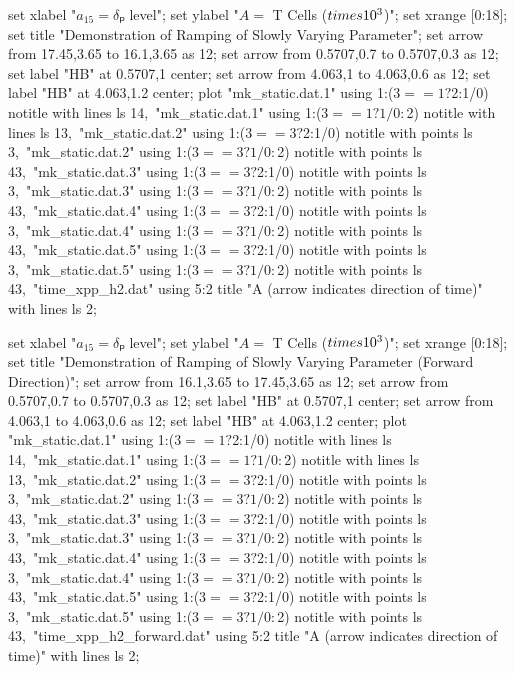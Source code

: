   set xlabel "$a_{15} = δₚ$ level";
  set ylabel "$A = $ T Cells ($\\times 10^3$)";
  set xrange [0:18];
  set title "Demonstration of Ramping of Slowly Varying Parameter";
  set arrow from 17.45,3.65 to 16.1,3.65 as 12;
  set arrow from 0.5707,0.7 to 0.5707,0.3 as 12;
  set label "HB" at 0.5707,1 center;
  set arrow from 4.063,1 to 4.063,0.6 as 12;
  set label "HB" at 4.063,1.2 center;
  plot "mk_static.dat.1" using 1:($3==1?$2:1/0) notitle with lines ls 14,\
       "mk_static.dat.1" using 1:($3==1?1/0:$2) notitle with lines ls 13,\
       "mk_static.dat.2" using 1:($3==3?$2:1/0) notitle with points ls 3,\
       "mk_static.dat.2" using 1:($3==3?1/0:$2) notitle with points ls 43,\
       "mk_static.dat.3" using 1:($3==3?$2:1/0) notitle with points ls 3,\
       "mk_static.dat.3" using 1:($3==3?1/0:$2) notitle with points ls 43,\
       "mk_static.dat.4" using 1:($3==3?$2:1/0) notitle with points ls 3,\
       "mk_static.dat.4" using 1:($3==3?1/0:$2) notitle with points ls 43,\
       "mk_static.dat.5" using 1:($3==3?$2:1/0) notitle with points ls 3,\
       "mk_static.dat.5" using 1:($3==3?1/0:$2) notitle with points ls 43,\
       "time_xpp_h2.dat" using 5:2 title "A (arrow indicates direction of time)" with lines ls 2;
\stopGNUPLOTscript

\startGNUPLOTscript[bifurcation_combined_h2_forward]
  set xlabel "$a_{15} = δₚ$ level";
  set ylabel "$A = $ T Cells ($\\times 10^3$)";
  set xrange [0:18];
  set title "Demonstration of Ramping of Slowly Varying Parameter (Forward Direction)";
  set arrow from 16.1,3.65 to 17.45,3.65 as 12;
  set arrow from 0.5707,0.7 to 0.5707,0.3 as 12;
  set label "HB" at 0.5707,1 center;
  set arrow from 4.063,1 to 4.063,0.6 as 12;
  set label "HB" at 4.063,1.2 center;
  plot "mk_static.dat.1" using 1:($3==1?$2:1/0) notitle with lines ls 14,\
       "mk_static.dat.1" using 1:($3==1?1/0:$2) notitle with lines ls 13,\
       "mk_static.dat.2" using 1:($3==3?$2:1/0) notitle with points ls 3,\
       "mk_static.dat.2" using 1:($3==3?1/0:$2) notitle with points ls 43,\
       "mk_static.dat.3" using 1:($3==3?$2:1/0) notitle with points ls 3,\
       "mk_static.dat.3" using 1:($3==3?1/0:$2) notitle with points ls 43,\
       "mk_static.dat.4" using 1:($3==3?$2:1/0) notitle with points ls 3,\
       "mk_static.dat.4" using 1:($3==3?1/0:$2) notitle with points ls 43,\
       "mk_static.dat.5" using 1:($3==3?$2:1/0) notitle with points ls 3,\
       "mk_static.dat.5" using 1:($3==3?1/0:$2) notitle with points ls 43,\
       "time_xpp_h2_forward.dat" using 5:2 title "A (arrow indicates direction of time)" with lines ls 2;
\stopGNUPLOTscript

